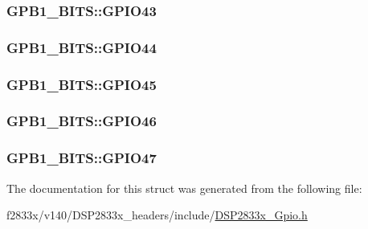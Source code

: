 \subsubsection[{G\+P\+I\+O43}]{ G\+P\+B1\+\_\+\+B\+I\+T\+S\+::\+G\+P\+I\+O43}\label{struct_g_p_b1___b_i_t_s_a249ba15ec2d1790737075724124f28c6}
\hypertarget{struct_g_p_b1___b_i_t_s_ac3d3bf632ae12b2e4b23104762297163}{}
\subsubsection[{G\+P\+I\+O44}]{ G\+P\+B1\+\_\+\+B\+I\+T\+S\+::\+G\+P\+I\+O44}\label{struct_g_p_b1___b_i_t_s_ac3d3bf632ae12b2e4b23104762297163}
\hypertarget{struct_g_p_b1___b_i_t_s_a8a89504d2694b3eac337568a68fbde86}{}
\subsubsection[{G\+P\+I\+O45}]{ G\+P\+B1\+\_\+\+B\+I\+T\+S\+::\+G\+P\+I\+O45}\label{struct_g_p_b1___b_i_t_s_a8a89504d2694b3eac337568a68fbde86}
\hypertarget{struct_g_p_b1___b_i_t_s_ac5c6bc9c79b30147415cee61cdd6f50f}{}
\subsubsection[{G\+P\+I\+O46}]{ G\+P\+B1\+\_\+\+B\+I\+T\+S\+::\+G\+P\+I\+O46}\label{struct_g_p_b1___b_i_t_s_ac5c6bc9c79b30147415cee61cdd6f50f}
\hypertarget{struct_g_p_b1___b_i_t_s_aefde0c00268f0710ed2af0a29f14e49b}{}
\subsubsection[{G\+P\+I\+O47}]{ G\+P\+B1\+\_\+\+B\+I\+T\+S\+::\+G\+P\+I\+O47}\label{struct_g_p_b1___b_i_t_s_aefde0c00268f0710ed2af0a29f14e49b}


The documentation for this struct was generated from the following file\+:\begin{DoxyCompactItemize}
\item 
f2833x/v140/\+D\+S\+P2833x\+\_\+headers/include/\hyperlink{_d_s_p2833x___gpio_8h}{D\+S\+P2833x\+\_\+\+Gpio.\+h}\end{DoxyCompactItemize}

